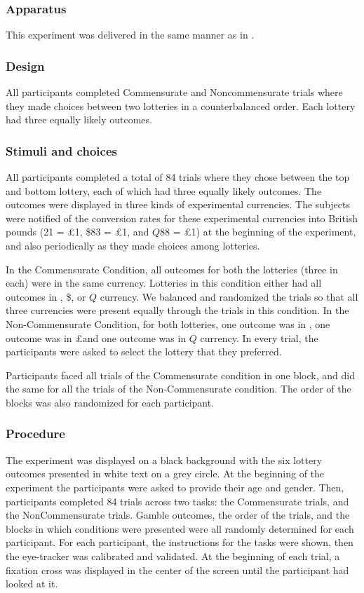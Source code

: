 \documentclass[doc, a4paper, apacite]{apa6}
\def\yenrule{\rule{1.3ex}{.1ex}}
\def\textyen{\renewcommand\stacktype{L}\stackon[.4ex]{\stackon[.65ex]{Y}{\yenrule}}{\yenrule}}
\begin{document}
\subsubsection{Apparatus}
This experiment was delivered in the same manner as in . 

\subsubsection{Design}
All participants completed Commensurate and Noncommensurate trials where they made choices between two lotteries in a counterbalanced order. Each lottery had three equally likely outcomes.

\subsubsection{Stimuli and choices}
All participants completed a total of 84 trials where they chose between the top and bottom lottery, each of which had three equally likely outcomes. The outcomes were displayed in three kinds of experimental currencies. The subjects were notified of the conversion rates for these experimental currencies into British pounds (\textyen 21 = \pounds1, \$83 = \pounds 1, and $Q88$ = \pounds1) at the beginning of the experiment, and also periodically as they made choices among lotteries.
 
In the Commensurate Condition, all outcomes for both the lotteries (three in each) were in the same currency. Lotteries in this condition either had all outcomes in \textyen, \$, or $Q$ currency. We balanced and randomized the trials so that all three currencies were present equally through the trials in this condition. In the Non-Commensurate Condition, for both lotteries, one outcome was in \textyen, one outcome was in \pounds\space and one outcome was in $Q$ currency. In every trial, the participants were asked to select the lottery that they preferred. 

Participants faced all trials of the Commensurate condition in one block, and did the same for all the trials of the Non-Commensurate condition. The order of the blocks was also randomized for each participant.

\subsubsection{Procedure}
The experiment was displayed on a black background with the six lottery outcomes presented in white text on a grey circle. At the beginning of the experiment the participants were asked to provide their age and gender. Then, participants completed 84 trials across two tasks: the Commensurate trials, and the NonCommensurate trials. Gamble outcomes, the order of the trials, and the blocks in which conditions were presented were all randomly determined for each participant. For each participant, the instructions for the tasks were shown, then the eye-tracker was calibrated and validated. At the beginning of each trial, a fixation cross was displayed in the center of the screen until the participant had looked at it. 
\end{document}
